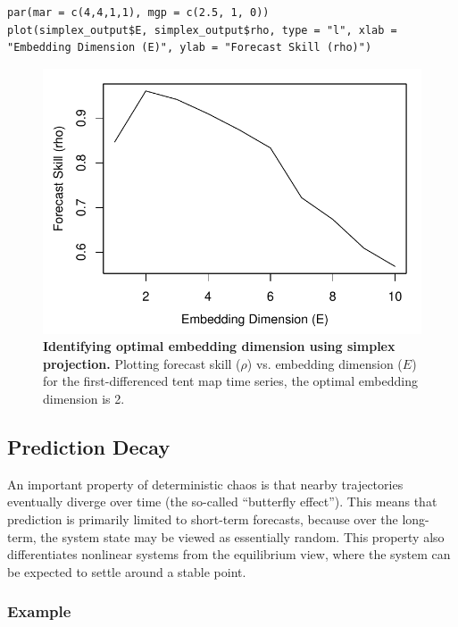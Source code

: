 \begin{lstlisting}
par(mar = c(4,4,1,1), mgp = c(2.5, 1, 0))
plot(simplex_output$E, simplex_output$rho, type = "l", xlab = "Embedding Dimension (E)", ylab = "Forecast Skill (rho)")
\end{lstlisting}

\begin{figure}[!ht]
\begin{center}\includegraphics[width=\maxwidth{\textwidth}]{fig_redm_3.pdf}\end{center}
\caption[Identifying optimal embedding dimension using simplex projection.]{\textbf{Identifying optimal embedding dimension using simplex projection.}\newline
Plotting forecast skill ($\rho$) vs. embedding dimension ($E$) for the first-differenced tent map time series, the optimal embedding dimension is 2.}
\end{figure}

\subsection{Prediction Decay}

An important property of deterministic chaos is that nearby trajectories eventually diverge over time (the so-called ``butterfly effect''). This means that prediction is primarily limited to short-term forecasts, because over the long-term, the system state may be viewed as essentially random. This property also differentiates nonlinear systems from the equilibrium view, where the system can be expected to settle around a stable point.

\subsubsection{Example}


